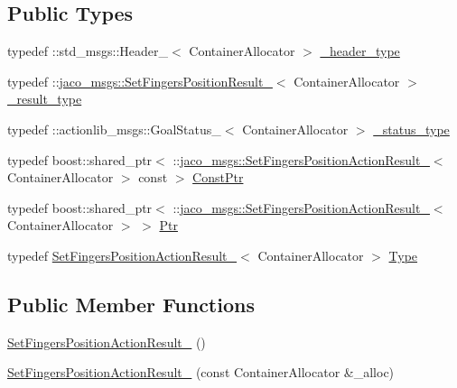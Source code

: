 \subsection*{Public Types}
\begin{DoxyCompactItemize}
\item 
typedef \+::std\+\_\+msgs\+::\+Header\+\_\+$<$ Container\+Allocator $>$ \hyperlink{structjaco__msgs_1_1SetFingersPositionActionResult___adafecfdd9d7d042f35c88e4c41aa2b4f}{\+\_\+header\+\_\+type}
\item 
typedef \+::\hyperlink{structjaco__msgs_1_1SetFingersPositionResult__}{jaco\+\_\+msgs\+::\+Set\+Fingers\+Position\+Result\+\_\+}$<$ Container\+Allocator $>$ \hyperlink{structjaco__msgs_1_1SetFingersPositionActionResult___a0afeedf3b25e89762f7afc0636d21640}{\+\_\+result\+\_\+type}
\item 
typedef \+::actionlib\+\_\+msgs\+::\+Goal\+Status\+\_\+$<$ Container\+Allocator $>$ \hyperlink{structjaco__msgs_1_1SetFingersPositionActionResult___ac4ef0553517c5a84f08a672d3b0d2c9f}{\+\_\+status\+\_\+type}
\item 
typedef boost\+::shared\+\_\+ptr$<$ \+::\hyperlink{structjaco__msgs_1_1SetFingersPositionActionResult__}{jaco\+\_\+msgs\+::\+Set\+Fingers\+Position\+Action\+Result\+\_\+}$<$ Container\+Allocator $>$ const  $>$ \hyperlink{structjaco__msgs_1_1SetFingersPositionActionResult___a368570cbffaf720aea48642ec7c8829e}{Const\+Ptr}
\item 
typedef boost\+::shared\+\_\+ptr$<$ \+::\hyperlink{structjaco__msgs_1_1SetFingersPositionActionResult__}{jaco\+\_\+msgs\+::\+Set\+Fingers\+Position\+Action\+Result\+\_\+}$<$ Container\+Allocator $>$ $>$ \hyperlink{structjaco__msgs_1_1SetFingersPositionActionResult___a3ddc98892b0e2d7b1853973b9fd24322}{Ptr}
\item 
typedef \hyperlink{structjaco__msgs_1_1SetFingersPositionActionResult__}{Set\+Fingers\+Position\+Action\+Result\+\_\+}$<$ Container\+Allocator $>$ \hyperlink{structjaco__msgs_1_1SetFingersPositionActionResult___ab425bbd950edd7263d5b580ebae81577}{Type}
\end{DoxyCompactItemize}
\subsection*{Public Member Functions}
\begin{DoxyCompactItemize}
\item 
\hyperlink{structjaco__msgs_1_1SetFingersPositionActionResult___a116424722e3d5b240b77f0e699102f0b}{Set\+Fingers\+Position\+Action\+Result\+\_\+} ()
\item 
\hyperlink{structjaco__msgs_1_1SetFingersPositionActionResult___a7c57ab3e9d99773be307f3f2e044936b}{Set\+Fingers\+Position\+Action\+Result\+\_\+} (const Container\+Allocator \&\+\_\+alloc)
\end{DoxyCompactItemize}
